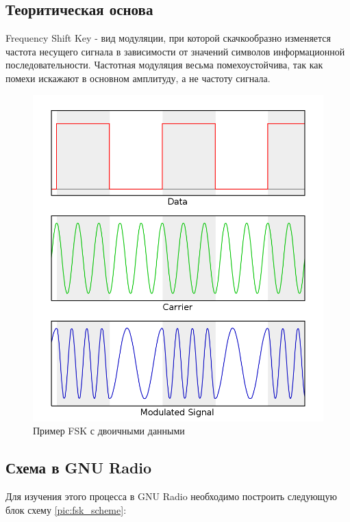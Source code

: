 \subsection{Теоритическая основа}

\qquad Frequency Shift Key - вид модуляции, при которой скачкообразно изменяется частота несущего сигнала в зависимости от значений символов информационной последовательности. Частотная модуляция весьма помехоустойчива, так как помехи искажают в основном амплитуду, а не частоту сигнала.
    
    \begin{figure}[H]
	\begin{center}
		\includegraphics[scale=0.4]{fig/lab12/fsk.png}
		\caption{Пример FSK с двоичными данными}
		\label{pic:fsk_example} %
	\end{center}
\end{figure}
\subsection{Схема в GNU Radio}    
    Для изучения этого процесса в GNU Radio\cite{gnuradio} необходимо построить следующую блок схему \ref{pic:fsk_scheme}:
    
